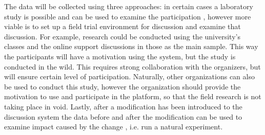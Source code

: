 \documentclass{article}
\begin{document}
The data will be collected using three approaches: in certain cases a laboratory study is possible and can be used to examine the participation , however more viable is  to set up a field trial environment for discussion and examine that discussion. For example, research could be conducted using the university's classes and the online support discussions in those as the main sample. This way the participants will have a motivation using the system, but the study is conducted in the wild. This requires strong collaboration with the organizers, but will ensure certain level of participation. Naturally, other organizations can also be used to conduct this study, however the organization should provide the motivation to use and participate in the platform, so that the field research is not taking place in void. Lastly, after a modification has been introduced to the discussion system the data before and after the modification can be used to examine impact caused by the change , i.e. run a natural experiment.


\end{document}
